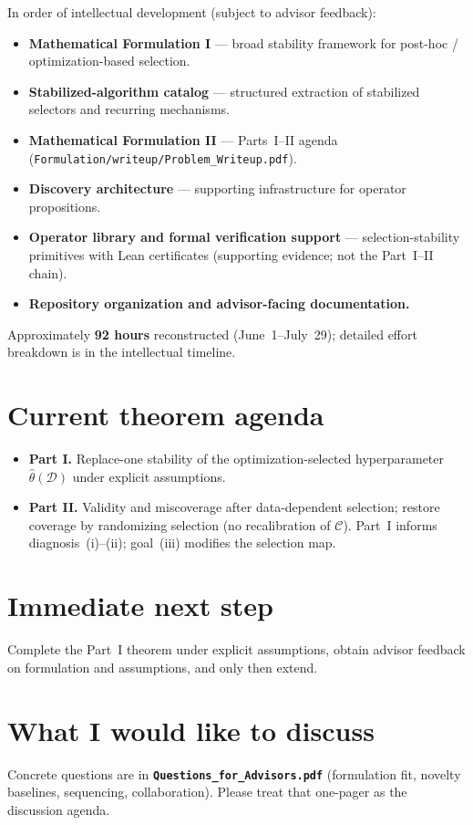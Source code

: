 \documentclass[11pt]{article}
\begin{document}
In order of intellectual development (subject to advisor feedback):
\begin{itemize}[itemsep=1pt]
  \item \textbf{Mathematical Formulation I} --- broad stability framework for post-hoc /
        optimization-based selection.
  \item \textbf{Stabilized-algorithm catalog} --- structured extraction of stabilized selectors
        and recurring mechanisms.
  \item \textbf{Mathematical Formulation II} --- Parts~I--II agenda
        (\texttt{Formulation/writeup/Problem\_Writeup.pdf}).
  \item \textbf{Discovery architecture} --- supporting infrastructure for operator propositions.
  \item \textbf{Operator library and formal verification support} --- selection-stability
        primitives with Lean certificates (supporting evidence; not the Part~I--II chain).
  \item \textbf{Repository organization and advisor-facing documentation.}
\end{itemize}
Approximately \textbf{92 hours} reconstructed (June~1--July~29); detailed effort breakdown is in the
intellectual timeline.

\section{Current theorem agenda}

\begin{itemize}[itemsep=1pt]
  \item \textbf{Part I.} Replace-one stability of the optimization-selected hyperparameter
        $\hat\theta(\mathcal{D})$ under explicit assumptions.
  \item \textbf{Part II.} Validity and miscoverage after data-dependent selection; restore
        coverage by randomizing selection (no recalibration of $\mathcal{C}$). Part~I informs
        diagnosis~(i)--(ii); goal~(iii) modifies the selection map.
\end{itemize}

\section{Immediate next step}

\begin{tcolorbox}[basebox]
Complete the Part~I theorem under explicit assumptions, obtain advisor feedback on formulation
and assumptions, and only then extend.
\end{tcolorbox}

\section{What I would like to discuss}

Concrete questions are in \textbf{\texttt{Questions\_for\_Advisors.pdf}} (formulation fit, novelty
baselines, sequencing, collaboration). Please treat that one-pager as the discussion agenda.
\end{document}
